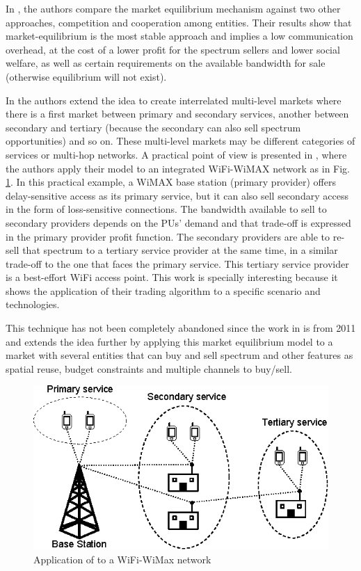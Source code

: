 In \cite{ref:Niyato2008_Mark}, the authors compare the market equilibrium mechanism against two other approaches, competition and cooperation among entities.
Their results show that market-equilibrium is the most stable approach and implies a low communication overhead, at the cost of a lower profit for the spectrum sellers and lower social welfare, as well as certain requirements on the available bandwidth for sale (otherwise equilibrium will not exist).

In \cite{ref:Niyato2007_Hier} the authors extend the idea to create interrelated multi-level markets where there is a first market between primary and secondary services, another between secondary and tertiary (because the secondary can also sell spectrum opportunities) and so on. These multi-level markets may be different categories of services or multi-hop networks. A practical point of view is presented in \cite{ref:Niyato2010}, where the authors apply their model to an integrated WiFi-WiMAX network as in Fig. \ref{fig:WiFi-WiMAX}. In this practical example, a WiMAX base station (primary provider) offers delay-sensitive access as its primary service, but it can also sell secondary access in the form of loss-sensitive connections. The bandwidth available to sell to secondary providers depends on the PUs' demand and that trade-off is expressed in the primary provider profit function. The secondary providers are able to re-sell that spectrum to a tertiary service provider at the same time, in a similar trade-off to the one that faces the primary service. This tertiary service provider is a best-effort WiFi access point. This work is specially interesting because it shows the application of their trading algorithm to a specific scenario and technologies. 

This technique has not been completely abandoned since the work in \cite{ref:Xu2011} is from 2011 and extends the idea further by applying this market equilibrium model to a market with several entities that can buy and sell spectrum and other features as spatial reuse, budget constraints and multiple channels to buy/sell.

\begin{figure}[ht]
	\begin{center}
  \includegraphics[scale=1]{Fig3.eps}
  \end{center}
  \caption{Application of \cite{ref:Niyato2010} to a WiFi-WiMax network}
   \label{fig:WiFi-WiMAX}
\end{figure}

